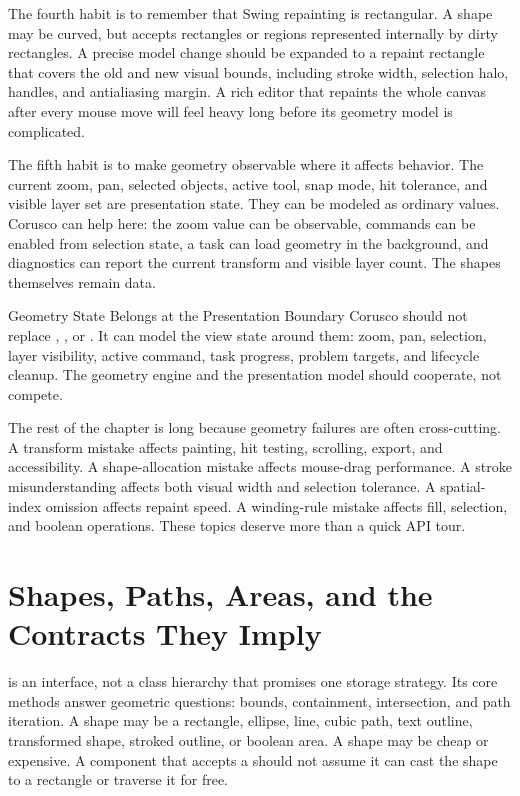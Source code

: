 The fourth habit is to remember that Swing repainting is rectangular. A shape may be curved, but  accepts rectangles or regions represented internally by dirty rectangles. A precise model change should be expanded to a repaint rectangle that covers the old and new visual bounds, including stroke width, selection halo, handles, and antialiasing margin. A rich editor that repaints the whole canvas after every mouse move will feel heavy long before its geometry model is complicated.

The fifth habit is to make geometry observable where it affects behavior. The current zoom, pan, selected objects, active tool, snap mode, hit tolerance, and visible layer set are presentation state. They can be modeled as ordinary values. Corusco can help here: the zoom value can be observable, commands can be enabled from selection state, a task can load geometry in the background, and diagnostics can report the current transform and visible layer count. The shapes themselves remain  data.

\begin{coruscobox}{Geometry State Belongs at the Presentation Boundary}
Corusco should not replace , , or . It can model the view state around them: zoom, pan, selection, layer visibility, active command, task progress, problem targets, and lifecycle cleanup. The geometry engine and the presentation model should cooperate, not compete.
\end{coruscobox}

The rest of the chapter is long because geometry failures are often cross-cutting. A transform mistake affects painting, hit testing, scrolling, export, and accessibility. A shape-allocation mistake affects mouse-drag performance. A stroke misunderstanding affects both visual width and selection tolerance. A spatial-index omission affects repaint speed. A winding-rule mistake affects fill, selection, and boolean operations. These topics deserve more than a quick API tour.

\section{Shapes, Paths, Areas, and the Contracts They Imply}

 is an interface, not a class hierarchy that promises one storage strategy. Its core methods answer geometric questions: bounds, containment, intersection, and path iteration. A shape may be a rectangle, ellipse, line, cubic path, text outline, transformed shape, stroked outline, or boolean area. A shape may be cheap or expensive. A component that accepts a  should not assume it can cast the shape to a rectangle or traverse it for free.

